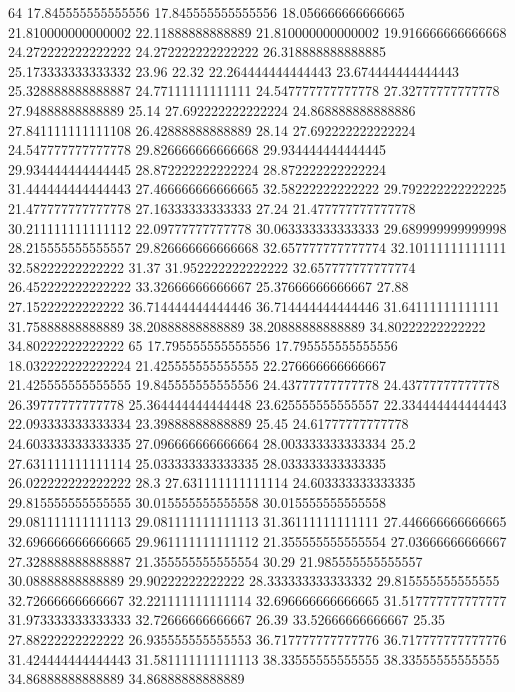 64 17.845555555555556 17.845555555555556 18.056666666666665 21.810000000000002 22.11888888888889 21.810000000000002 19.916666666666668 24.272222222222222 24.272222222222222 26.318888888888885 25.173333333333332 23.96 22.32 22.264444444444443 23.674444444444443 25.328888888888887 24.77111111111111 24.547777777777778 27.32777777777778 27.94888888888889 25.14 27.692222222222224 24.868888888888886 27.841111111111108 26.42888888888889 28.14 27.692222222222224 24.547777777777778 29.826666666666668 29.934444444444445 29.934444444444445 28.872222222222224 28.872222222222224 31.444444444444443 27.466666666666665 32.58222222222222 29.792222222222225 21.477777777777778 27.16333333333333 27.24 21.477777777777778 30.211111111111112 22.09777777777778 30.063333333333333 29.689999999999998 28.215555555555557 29.826666666666668 32.657777777777774 32.10111111111111 32.58222222222222 31.37 31.952222222222222 32.657777777777774 26.452222222222222 33.32666666666667 25.37666666666667 27.88 27.15222222222222 36.714444444444446 36.714444444444446 31.64111111111111 31.75888888888889 38.20888888888889 38.20888888888889 34.80222222222222 34.80222222222222
65 17.795555555555556 17.795555555555556 18.032222222222224 21.425555555555555 22.276666666666667 21.425555555555555 19.845555555555556 24.43777777777778 24.43777777777778 26.39777777777778 25.364444444444448 23.625555555555557 22.334444444444443 22.093333333333334 23.39888888888889 25.45 24.61777777777778 24.603333333333335 27.096666666666664 28.003333333333334 25.2 27.631111111111114 25.033333333333335 28.033333333333335 26.022222222222222 28.3 27.631111111111114 24.603333333333335 29.815555555555555 30.015555555555558 30.015555555555558 29.081111111111113 29.081111111111113 31.36111111111111 27.446666666666665 32.696666666666665 29.961111111111112 21.355555555555554 27.03666666666667 27.328888888888887 21.355555555555554 30.29 21.985555555555557 30.08888888888889 29.90222222222222 28.333333333333332 29.815555555555555 32.72666666666667 32.221111111111114 32.696666666666665 31.517777777777777 31.973333333333333 32.72666666666667 26.39 33.52666666666667 25.35 27.88222222222222 26.935555555555553 36.717777777777776 36.717777777777776 31.424444444444443 31.581111111111113 38.33555555555555 38.33555555555555 34.86888888888889 34.86888888888889
